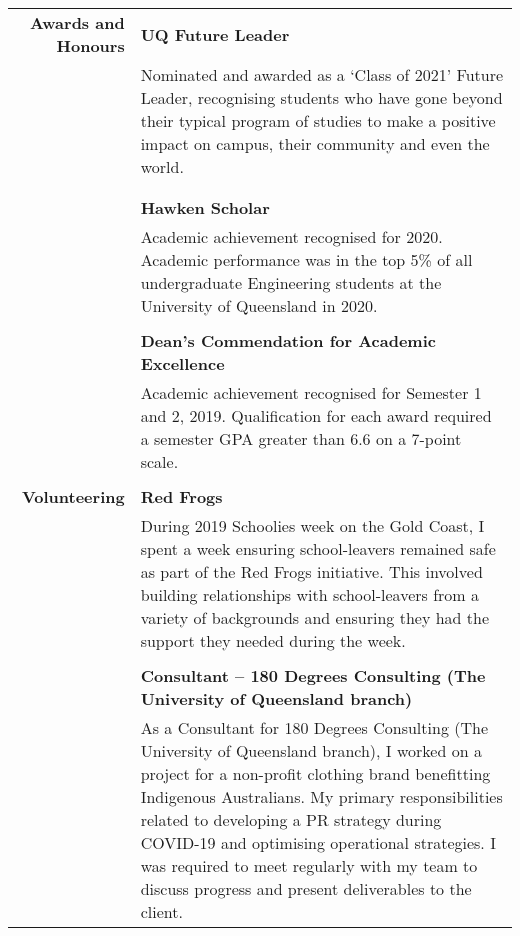 \documentclass[a4paper]{article}
\begin{document}
\begin{longtable}{r p{13.5cm}}
	\textbf{Awards and Honours}  \vline & \textbf{UQ Future Leader} \\
										\vline & Nominated and awarded as a `Class of 2021' Future Leader, recognising students who have gone beyond their typical program of studies to make a positive impact on campus, their community and even the world. \\
										& \\
										& \\

										\vline & \textbf{Hawken Scholar} \\
										\vline & Academic achievement recognised for 2020. Academic performance was in the top 5\% of all undergraduate Engineering students at the University of Queensland in 2020. \\
										\vline & \\
										
										\vline & \textbf{Dean's Commendation for Academic Excellence} \\
										\vline & Academic achievement recognised for Semester 1 and 2, 2019. Qualification for each award required a semester GPA greater than 6.6 on a 7-point scale. \\
										\vline & \\
										
	\textbf{Volunteering} 	\vline & \textbf{Red Frogs} \\
										\vline & During 2019 Schoolies week on the Gold Coast, I spent a week ensuring school-leavers remained safe as part of the Red Frogs initiative. This involved building relationships with school-leavers from a variety of backgrounds and ensuring they had the support they needed during the week. \\
										\vline & \\
										
										\vline & \textbf{Consultant – 180 Degrees Consulting (The University of Queensland branch)} \\
										\vline & As a Consultant for 180 Degrees Consulting (The University of Queensland branch), I worked on a project for a non-profit clothing brand benefitting Indigenous Australians. My primary responsibilities related to developing a PR strategy during COVID-19 and optimising operational strategies. I was required to meet regularly with my team to discuss progress and present deliverables to the client. \\
							     
\end{longtable}
\end{document}
